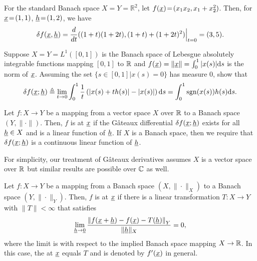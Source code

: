 \begin{example}
For the standard Banach space $X\!=\!Y\!=\!\mathbb{R}^2$, let $f(\underline{x})\! =\! (x_1 x_2,x_1+x_2^2)$.
Then, for $\underline{x}\!=\!(1,1)$, $\underline{h}\!=\!(1,2)$, we have
\[ \delta f ( \underline{x},\underline{h} ) = \frac{d}{dt} ((1+t)(1+2t),(1+t)+(1+2t)^2) \Big|_{t=0} = (3,5). \]
\end{example}

\begin{problem}
Suppose $X=Y=L^1 ([0,1])$ is the Banach space of Lebesgue absolutely integrable functions mapping $[0,1]$ to $\mathbb{R}$ and $f(\underline{x}) = \| \underline{x} \| = \int_0^1 |x(s)| \mathrm{d} s$ is the norm of $\underline{x}$.
Assuming the set $\{ s\in [0,1] | x(s)=0 \}$ has measure 0, show that
\[ \delta f (\underline{x};\underline{h}) \triangleq \lim_{t \to 0}  \int_0^1 \frac{1}{t} \left( |x(s)+t h(s)| - |x(s)| \right) \mathrm{d} s = \int_0^1 \mathrm{sgn}(x(s)) h(s) \mathrm{d} s. \] 
\end{problem}

\begin{definition}
Let $f \colon X \rightarrow Y$ be a mapping from a vector space $X$ over $\mathbb{R}$ to a Banach space $(Y,\|\cdot\|)$.
Then, $f$ is  at $\underline{x}$ if the G\^{a}teaux differential $\delta f (\underline{x};\underline{h})$ exists for all $\underline{h} \in X$ and is a linear function of $\underline{h}$.
If $X$ is a Banach space, then we require that $\delta f (\underline{x};\underline{h})$ is a continuous linear function of $\underline{h}$.
\end{definition}

\begin{remark}
For simplicity, our treatment of G\^{a}teaux derivatives assumes $X$ is a vector space over $\mathbb{R}$ but similar results are possible over $\mathbb{C}$ as well.
\end{remark}

\begin{definition}
Let $f \colon X \rightarrow Y$ be a mapping from a Banach space $(X,\|\cdot\|_X)$ to a Banach space $(Y,\|\cdot\|_Y)$.
Then, $f$ is  at $\underline{x}$ if there is a linear transformation $T\colon X \to Y$ with $\| T \| < \infty$ that satisfies 
\begin{equation} \label{eq:frechet_def}
\lim_{\underline{h} \to \underline{0}} \frac{\left\|f(\underline{x}+ \underline{h}) - f(\underline{x}) - T(\underline{h}) \right\|_Y}{\| \underline{h} \|_X} = 0,
\end{equation}
where the limit is with respect to the implied Banach space mapping $X\to \mathbb{R}$.
In this case, the  at $\underline{x}$ equals $T$ and is denoted by $f'(\underline{x})$ in general.
\end{definition}

